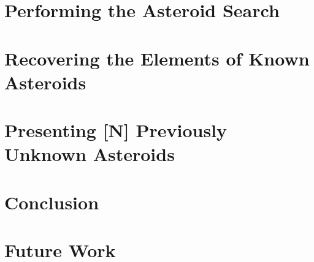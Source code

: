 \section{Performing the Asteroid Search}
\label{section_asteroid_search}

\section{Recovering the Elements of Known Asteroids}
\label{section_results_known_ast}

\section{Presenting [N] Previously Unknown Asteroids}
\label{section_results_unknown_ast}

\section{Conclusion}
\label{search_conclusion}

\section{Future Work}
\label{section_future_work}

